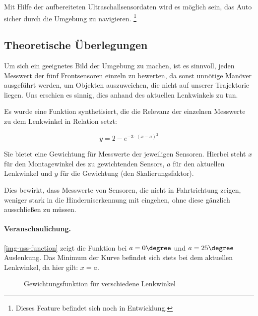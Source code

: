 \documentclass[a4paper,12pt]{report}
\begin{document}
	Mit Hilfe %
	der aufbereiteten Ultraschallsensordaten wird es möglich sein, das Auto sicher durch die Umgebung zu navigieren.
	\footnote{Dieses Feature befindet sich noch in Entwicklung.} %
	
\subsection{Theoretische Überlegungen}
	
	Um sich ein geeignetes Bild der Umgebung zu machen, ist es sinnvoll, jeden  Messwert der fünf Frontsensoren einzeln zu bewerten, da sonst unnötige Manöver ausgeführt werden, um Objekten auszuweichen, die nicht auf unserer Trajektorie liegen.
	Uns erschien es sinnig, dies anhand des aktuellen Lenkwinkels zu tun.
	
	Es wurde eine Funktion synthetisiert, die die Relevanz der einzelnen Messwerte zu dem Lenkwinkel in Relation setzt:
	
		\[y=2-e^{-3 \cdot \left( x-a \right)^2}\]
	
	Sie bietet eine Gewichtung für Messwerte der jeweiligen Sensoren.
	Hierbei steht $x$ für den Montagewinkel des zu gewichtenden Sensors, $a$ für den aktuellen Lenkwinkel und $y$ für die Gewichtung (den Skalierungsfaktor).
	
	Dies bewirkt, dass Messwerte von Sensoren, die nicht in Fahrtrichtung zeigen, weniger stark in die Hinderniserkennung mit eingehen, ohne diese gänzlich ausschließen zu müssen.
	
	\paragraph{Veranschaulichung.} \autoref{img-uss-function} zeigt die Funktion bei $a = 0\degree$ und $a = 25\degree$ Auslenkung.
	Das Minimum der Kurve befindet sich stets bei dem aktuellen Lenkwinkel, da hier gilt: $x = a$.
	
	\begin{figure}[ht]
		\centering
		
		\caption{Gewichtungsfunktion für verschiedene Lenkwinkel}
		\label{img-uss-function}
	\end{figure}
\end{document}
